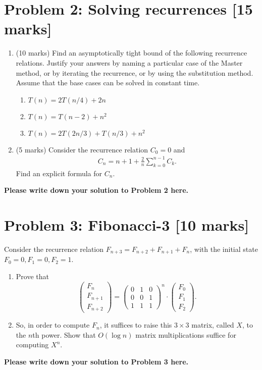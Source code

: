 \documentclass[11pt,twoside]{article}
\newcommand{\problem}[1]{\section*{Problem #1}}
\newenvironment{solution}{{\par\noindent\it Solution.}}{}
\begin{document}
\problem{2: Solving recurrences [15 marks]}
		\begin{enumerate}
			\item (10 marks) Find an asymptotically tight bound of the following recurrence relations. Justify
your answers by naming a particular case of the Master method, or by iterating the
recurrence, or by using the substitution method. Assume that the base cases can be solved in constant time. 
			\begin{enumerate}
				\item $T(n)=2T(n/4)+2n$
				\item $T(n)=T(n-2)+n^2$
				\item $T(n)=2T(2n/3)+T(n/3)+n^2$
			\end{enumerate}
			\item (5 marks)
				Consider the recurrence relation $C_0=0$ and 
				\begin{align*}
				C_n=n+1+\frac{2}{n}\sum_{k=0}^{n-1}C_k.
				\end{align*}
				Find an explicit formula for $C_n$. 
		\end{enumerate}
\begin{solution}
\textbf{Please write down your solution to Problem 2 here.}
\end{solution}


\problem{3: Fibonacci-3 [10 marks]}
Consider the recurrence relation $F_{n+3}=F_{n+2}+F_{n+1}+F_{n}$, with the initial state $F_0=0,F_1=0,F_2=1$.
\begin{enumerate}
	\item Prove that	
	$$\begin{pmatrix} F_{n} \\ F_{n+1}\\ F_{n+2} \end{pmatrix} = \begin{pmatrix} 0 & 1 & 0 \\ 0 & 0 & 1\\ 1 & 1 & 1 \end{pmatrix}^n \cdot \begin{pmatrix} F_{0} \\ F_1 \\ F_2 \end{pmatrix}.$$	
	\item So, in order to compute $F_n$, it suffices to raise this $3\times 3$ matrix, called $X$, to the $n$th power. Show that $O(\log{n})$ matrix multiplications suffice for computing $X^n$.
\end{enumerate}
\begin{solution}
\textbf{Please write down your solution to Problem 3 here.}
\end{solution}
\end{document}
